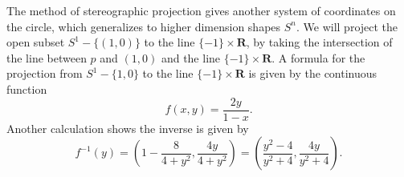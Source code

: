 \begin{example}

    The method of stereographic projection gives another system of coordinates on the circle, which generalizes to higher dimension shapes $S^n$. We will project the open subset $S^1 - \{ (1,0) \}$ to the line $\{ -1 \} \times \mathbf{R}$, by taking the intersection of the line between $p$ and $(1,0)$ and the line $\{ -1 \} \times \mathbf{R}$. A formula for the projection from $S^1 - \{ 1, 0 \}$ to the line $\{ -1 \} \times \mathbf{R}$ is given by the continuous function
    \[ f(x,y) = \frac{2y}{1-x}. \]
    Another calculation shows the inverse is given by
    \[ f^{-1}(y) = \left(1 - \frac{8}{4 + y^2} , \frac{4y}{4 + y^2} \right) = \left( \frac{y^2 - 4}{y^2 + 4}, \frac{4y}{y^2 + 4} \right). \]

\end{example}
